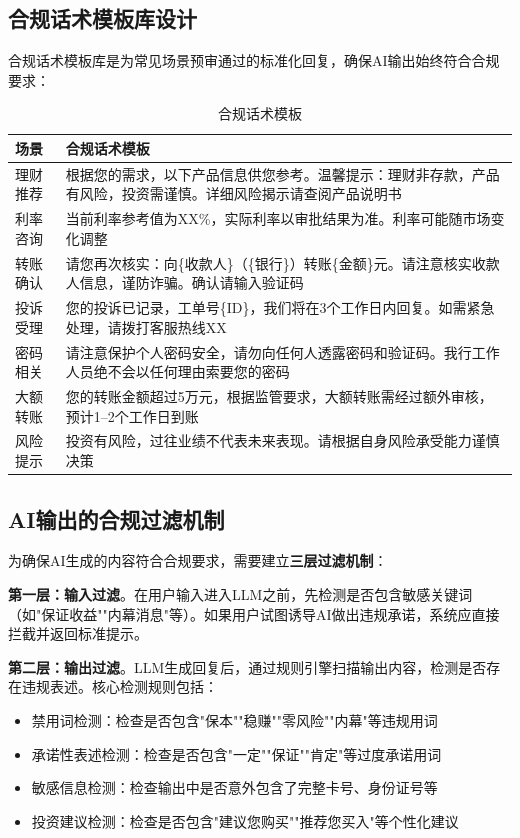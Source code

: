 \subsection{合规话术模板库设计}

合规话术模板库是为常见场景预审通过的标准化回复，确保AI输出始终符合合规要求：

\begin{table}[H]
\centering
\small
\begin{tabular}{lp{8cm}}
\toprule
\textbf{场景} & \textbf{合规话术模板} \\
\midrule
理财推荐 & 根据您的需求，以下产品信息供您参考。温馨提示：理财非存款，产品有风险，投资需谨慎。详细风险揭示请查阅产品说明书 \\
利率咨询 & 当前利率参考值为XX\%，实际利率以审批结果为准。利率可能随市场变化调整 \\
转账确认 & 请您再次核实：向\{收款人\}（\{银行\}）转账\{金额\}元。请注意核实收款人信息，谨防诈骗。确认请输入验证码 \\
投诉受理 & 您的投诉已记录，工单号\{ID\}，我们将在3个工作日内回复。如需紧急处理，请拨打客服热线XX \\
密码相关 & 请注意保护个人密码安全，请勿向任何人透露密码和验证码。我行工作人员绝不会以任何理由索要您的密码 \\
大额转账 & 您的转账金额超过5万元，根据监管要求，大额转账需经过额外审核，预计1--2个工作日到账 \\
风险提示 & 投资有风险，过往业绩不代表未来表现。请根据自身风险承受能力谨慎决策 \\
\bottomrule
\end{tabular}
\caption{合规话术模板}
\end{table}

\subsection{AI输出的合规过滤机制}

为确保AI生成的内容符合合规要求，需要建立\textbf{三层过滤机制}：

\textbf{第一层：输入过滤}。在用户输入进入LLM之前，先检测是否包含敏感关键词（如"保证收益""内幕消息"等）。如果用户试图诱导AI做出违规承诺，系统应直接拦截并返回标准提示。

\textbf{第二层：输出过滤}。LLM生成回复后，通过规则引擎扫描输出内容，检测是否存在违规表述。核心检测规则包括：

\begin{itemize}[leftmargin=2em]
  \item 禁用词检测：检查是否包含"保本""稳赚""零风险""内幕"等违规用词
  \item 承诺性表述检测：检查是否包含"一定""保证""肯定"等过度承诺用词
  \item 敏感信息检测：检查输出中是否意外包含了完整卡号、身份证号等
  \item 投资建议检测：检查是否包含"建议您购买""推荐您买入"等个性化建议
\end{itemize}

